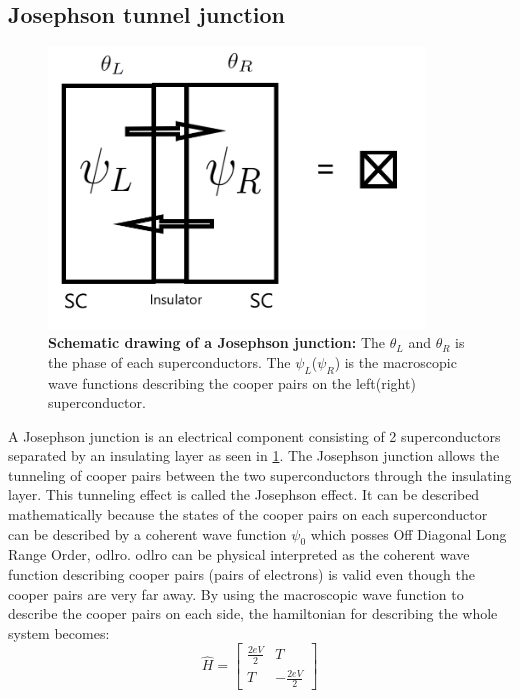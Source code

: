     \subsection{Josephson tunnel junction}
        \begin{figure}
            \centering
                \includegraphics[width = 10cm]{Images/Josephson junction.png}
                \caption[Schematic drawing of a Josephson Junction]{\textbf{Schematic drawing of a Josephson junction:} The $\theta_L$ and $\theta_R$ is the phase of each superconductors. The $\psi_L$($\psi_R$) is the macroscopic wave functions describing the cooper pairs on the left(right) superconductor.}
            \label{fig:JJ}
        \end{figure}
        A Josephson junction is an electrical component consisting of 2 superconductors separated by an insulating layer as seen in \ref{fig:JJ}. The Josephson junction allows the tunneling of cooper pairs between the two superconductors through the insulating layer. This tunneling effect is called the Josephson effect. It can be described mathematically because the states of the cooper pairs on each superconductor can be described by a coherent wave function $\psi_0$ which posses  Off Diagonal Long Range Order, \acrshort{odlro}. \acrshort{odlro} can be physical interpreted as the coherent wave function describing cooper pairs (pairs of electrons) is valid even though the cooper pairs are very far away. By using the macroscopic wave function to describe the cooper pairs on each side, the hamiltonian for describing the whole system becomes: 
        \begin{equation}
        \hat{H} = 
            \begin{bmatrix}
            \frac{2eV}{2} & T \\
            T & -\frac{2eV}{2} 
            \end{bmatrix} 
        \end{equation}
